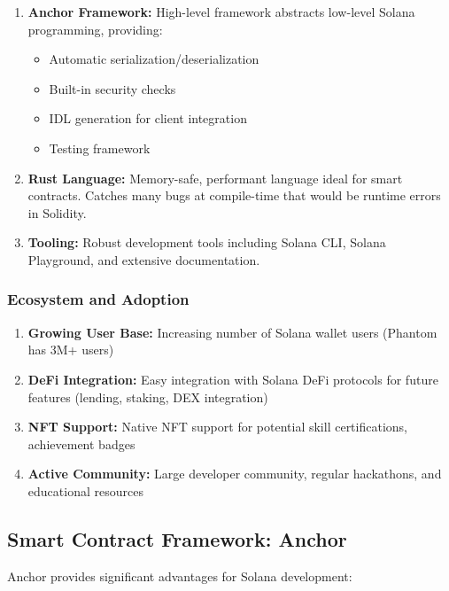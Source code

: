 \documentclass[a4paper,13pt,twoside]{report}
\theoremstyle{definition}
\begin{document}
\begin{enumerate}
    \item \textbf{Anchor Framework:} High-level framework abstracts low-level Solana programming, providing:
    \begin{itemize}
        \item Automatic serialization/deserialization
        \item Built-in security checks
        \item IDL generation for client integration
        \item Testing framework
    \end{itemize}

    \item \textbf{Rust Language:} Memory-safe, performant language ideal for smart contracts. Catches many bugs at compile-time that would be runtime errors in Solidity.

    \item \textbf{Tooling:} Robust development tools including Solana CLI, Solana Playground, and extensive documentation.
\end{enumerate}

\subsubsection{Ecosystem and Adoption}

\begin{enumerate}
    \item \textbf{Growing User Base:} Increasing number of Solana wallet users (Phantom has 3M+ users)

    \item \textbf{DeFi Integration:} Easy integration with Solana DeFi protocols for future features (lending, staking, DEX integration)

    \item \textbf{NFT Support:} Native NFT support for potential skill certifications, achievement badges

    \item \textbf{Active Community:} Large developer community, regular hackathons, and educational resources
\end{enumerate}

\subsection{Smart Contract Framework: Anchor}

Anchor provides significant advantages for Solana development:
\end{document}
